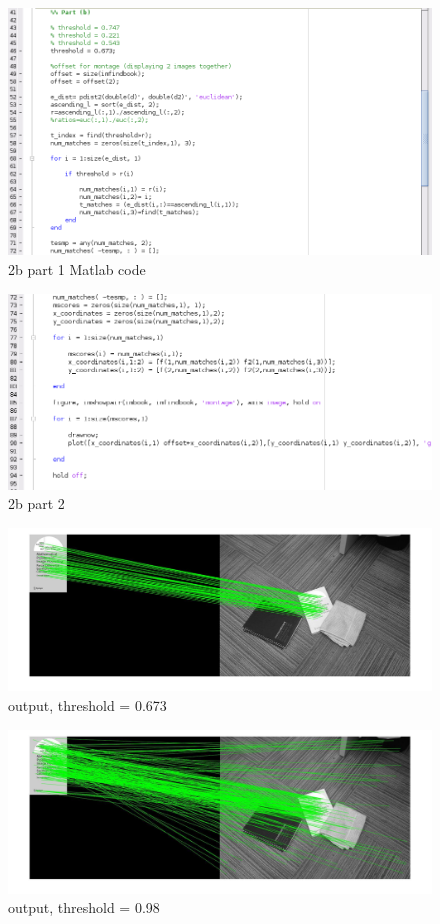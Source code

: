 \documentclass[]{article}
\begin{document}
\begin{figure}[h!]
\centering
\includegraphics[width=1.35\textwidth]{img/2b1-code.png}
\caption{2b part 1 Matlab code}
\end{figure}
\begin{figure}[h!]
\centering
\includegraphics[width=1.35\textwidth]{img/2b2-code.png}
\caption{2b part 2}
\end{figure}
\begin{figure}[h!]
\centering
\includegraphics[width=1.35\textwidth]{img/2b.jpg}
\caption{output, threshold = 0.673}
\end{figure}
\begin{figure}[h!]
\centering
\includegraphics[width=1.35\textwidth]{img/2b-t098.jpg}
\caption{output, threshold = 0.98}
\end{figure}
\end{document}
